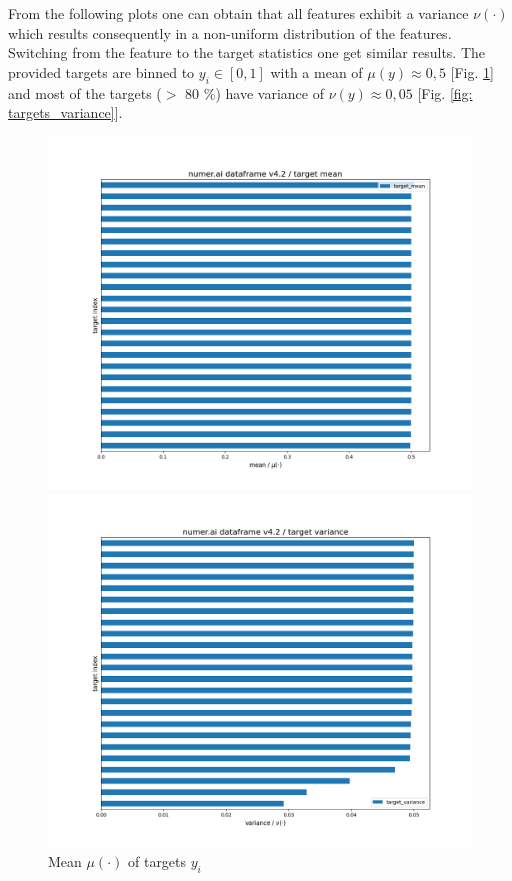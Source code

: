 \documentclass[12pt, a4paper]{article}
\begin{document}
From the following plots one can obtain that all features exhibit a variance $\nu(\cdot)$ which results consequently in a non-uniform distribution of the features.
Switching from the feature to the target statistics one get similar results. The provided targets are binned to $y_i \in [0,1]$ with a mean of $\mu(y) \approx 0{,}5$ [Fig. \ref{fig: targets_mean}] and most of the targets ($>$ 80 \%) have variance of $\nu(y) \approx 0{,}05$ [Fig. \ref{fig: targets_variance}].
\begin{figure}[htbp]
\begin{minipage}[t]{8.5cm}
\vspace{0pt}
\centering
\includegraphics[width=1\textwidth,trim={0 0 0 0},clip]{figures/train_df_targets_mean_horizontal_barplot_2024-02-29.png}
\caption[Mean of Targets]{Mean $\mu(\cdot)$ of targets $y_i$}
\label{fig: targets_mean}
\end{minipage}
\hfill
\begin{minipage}[t]{8.5cm}
\vspace{0pt}
\centering
\includegraphics[width=1\textwidth,trim={0 0 0 0},clip]{figures/train_df_targets_variance_horizontal_barplot_2024-02-29.png}

\end{minipage}
\end{figure}
\end{document}
